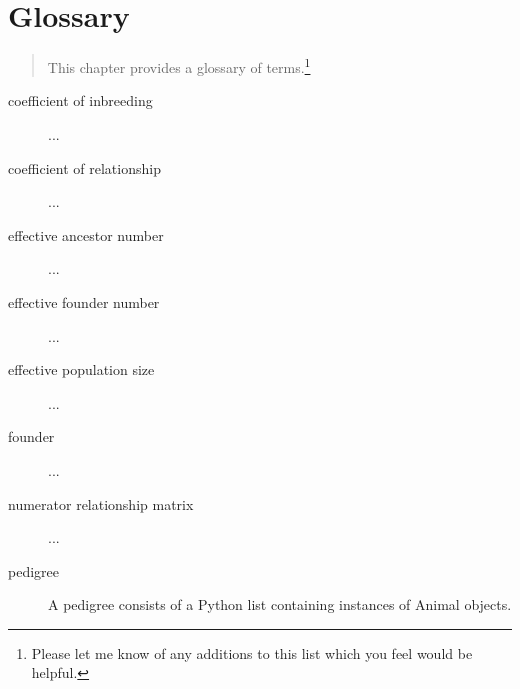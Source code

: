\chapter{Glossary}
\label{cha:glossary}

\begin{quote} 
   This chapter provides a glossary of terms.\footnote{Please let me know of
      any additions to this list which you feel would be helpful.}
\end{quote}

\begin{description}
\item[coefficient of inbreeding] ...
\end{description}

\begin{description}
\item[coefficient of relationship] ...
\end{description}

\begin{description}
\item[effective ancestor number] ...
\end{description}

\begin{description}
\item[effective founder number] ...
\end{description}

\begin{description}
\item[effective population size] ...
\end{description}

\begin{description}
\item[founder] ...
\end{description}

\begin{description}
\item[numerator relationship matrix] ...
\end{description}

\begin{description}
\item[pedigree] A \PYPEDAL{} pedigree consists of a Python list containing instances of \PYPEDAL{} Animal{} objects.
\end{description}